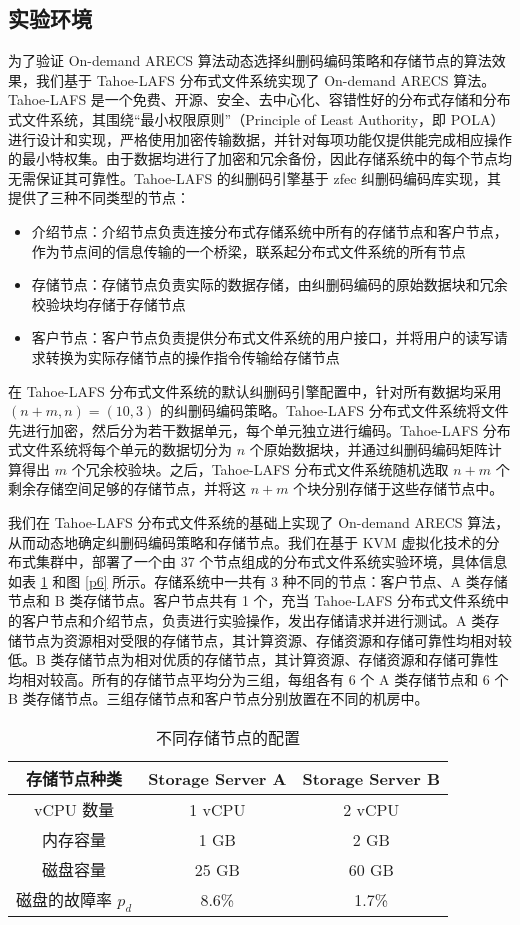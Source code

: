 \subsection{实验环境}
为了验证 On-demand ARECS 算法动态选择纠删码编码策略和存储节点的算法效果，我们基于 Tahoe-LAFS 分布式文件系统\cite{wilcox2008tahoe}实现了 On-demand ARECS 算法。Tahoe-LAFS 是一个免费、开源、安全、去中心化、容错性好的分布式存储和分布式文件系统，其围绕“最小权限原则”（Principle of Least Authority，即 POLA）进行设计和实现，严格使用加密传输数据，并针对每项功能仅提供能完成相应操作的最小特权集。由于数据均进行了加密和冗余备份，因此存储系统中的每个节点均无需保证其可靠性。Tahoe-LAFS 的纠删码引擎基于 zfec 纠删码编码库实现，其提供了三种不同类型的节点：
\begin{itemize}
\item 介绍节点：介绍节点负责连接分布式存储系统中所有的存储节点和客户节点，作为节点间的信息传输的一个桥梁，联系起分布式文件系统的所有节点
\item 存储节点：存储节点负责实际的数据存储，由纠删码编码的原始数据块和冗余校验块均存储于存储节点
\item 客户节点：客户节点负责提供分布式文件系统的用户接口，并将用户的读写请求转换为实际存储节点的操作指令传输给存储节点
\end{itemize}

在 Tahoe-LAFS 分布式文件系统的默认纠删码引擎配置中，针对所有数据均采用 $(n+m,n)=(10,3)$ 的纠删码编码策略。Tahoe-LAFS 分布式文件系统将文件先进行加密，然后分为若干数据单元，每个单元独立进行编码。Tahoe-LAFS 分布式文件系统将每个单元的数据切分为 $n$ 个原始数据块，并通过纠删码编码矩阵计算得出 $m$ 个冗余校验块。之后，Tahoe-LAFS 分布式文件系统随机选取 $n+m$ 个剩余存储空间足够的存储节点，并将这 $n+m$ 个块分别存储于这些存储节点中。

我们在 Tahoe-LAFS 分布式文件系统的基础上实现了 On-demand ARECS 算法，从而动态地确定纠删码编码策略和存储节点。我们在基于 KVM 虚拟化技术的分布式集群中，部署了一个由 37 个节点组成的分布式文件系统实验环境，具体信息如表 \ref{t2} 和图 \ref{p6} 所示。存储系统中一共有 3 种不同的节点：客户节点、A 类存储节点和 B 类存储节点。客户节点共有 1 个，充当 Tahoe-LAFS 分布式文件系统中的客户节点和介绍节点，负责进行实验操作，发出存储请求并进行测试。A 类存储节点为资源相对受限的存储节点，其计算资源、存储资源和存储可靠性均相对较低。B 类存储节点为相对优质的存储节点，其计算资源、存储资源和存储可靠性均相对较高。所有的存储节点平均分为三组，每组各有 6 个 A 类存储节点和 6 个 B 类存储节点。三组存储节点和客户节点分别放置在不同的机房中。

\begin{table}[!htb]
\centering
\caption{不同存储节点的配置}
\begin{tabular}{c|c|c}
\hline
存储节点种类 & Storage Server A & Storage Server B\\\hline
vCPU 数量 & 1 vCPU & 2 vCPU\\\hline
内存容量 & 1 GB & 2 GB\\\hline
磁盘容量 & 25 GB & 60 GB\\\hline
磁盘的故障率 $p_{d}$ & 8.6\% & 1.7\%\\\hline
\end{tabular}
\label{t2}
\end{table}

